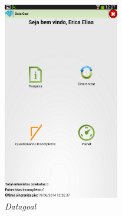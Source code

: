 \documentclass[
	12pt,				%
    oneside,			%
	a4paper,			%
	english,			%
	french,				%
	spanish,			%
	brazil,				%
	]{abntex2}
\begin{document}
\begin{figure} [H] 
\label{figura1} 
\caption{\textit{Datagoal}}
\includegraphics[width=0.45\textwidth]{datagoal.png} %
\end{figure}
\end{document}
